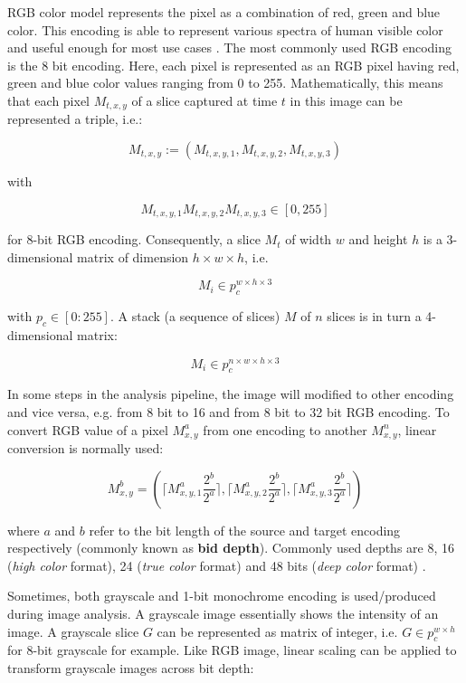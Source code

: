 \documentclass[pdftex,12pt,a4paper]{report}
\begin{document}
RGB color model represents the pixel as a combination of red, green and blue color. This encoding is able to represent various spectra of human visible color and useful enough for most use cases \cite{sonka2014image, jayant1993signal}. The most commonly used RGB encoding is the 8 bit encoding. Here, each pixel is represented as an RGB pixel having red, green and blue color values ranging from 0 to 255. Mathematically, this means that each pixel $M_{t,x,y}$ of a slice captured at time $t$ in this image can be represented a triple, i.e.:

\begin{equation}
\label{equation:rgb_pixel_def}
M_{t, x, y} := (M_{t, x, y, 1}, M_{t, x, y, 2}, M_{t, x, y, 3})
\end{equation}

with

$$
M_{t, x, y, 1} M_{t, x, y, 2} M_{t, x, y, 3} \in [0,255]
$$

for 8-bit RGB encoding. Consequently, a slice $M_t$ of width $w$ and height $h$ is a 3-dimensional matrix of dimension $h \times w \times h$, i.e.

$$
M_i \in p_c^{w \times h \times 3}
$$ 

with $p_c \in [0:255]$. A stack (a sequence of slices) $M$ of $n$ slices is in turn a 4-dimensional matrix:

$$
M_i \in p_c^{n \times w \times h \times 3}
$$ 

In some steps in the analysis pipeline, the image will modified to other encoding and vice versa, e.g. from 8 bit to 16 and from 8 bit to 32 bit RGB encoding. To convert RGB value of a pixel $M^a_{x,y}$ from one encoding to another $M^n_{x,y}$, linear conversion is normally used:

\begin{equation}
\label{euqation:linear_conv_rgb}
M^b_{x,y} = (\lceil M^a_{x,y, 1} \frac{2^b}{2^a} \rceil, \lceil M^a_{x,y, 2} \frac{2^b}{2^a} \rceil, \lceil M^a_{x,y, 3} \frac{2^b}{2^a} \rceil)
\end{equation}

where $a$ and $b$ refer to the bit length of the source and target encoding respectively (commonly known as \textbf{bid depth}).  Commonly used depths are 8, 16 (\textit{high color} format), 24 (\textit{true color} format) and 48 bits (\textit{deep color} format) \cite{lim1990two, sharma1997digital, sullivan2012overview}. 

Sometimes, both grayscale and 1-bit monochrome encoding is used/produced during image analysis. A grayscale image essentially shows the intensity of an image. A grayscale slice $G$ can be represented as matrix of integer, i.e. $G \in p_c^{w \times h}$ for 8-bit grayscale for example. Like RGB image, linear scaling can be applied to transform grayscale images across bit depth:
\end{document}
